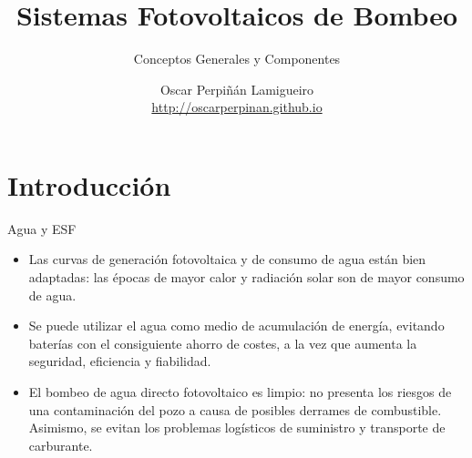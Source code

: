 \documentclass[xcolor={usenames,svgnames,dvipsnames}]{beamer}
\author{Oscar Perpiñán Lamigueiro \\ \url{http://oscarperpinan.github.io}}
\date{}
\title{Sistemas Fotovoltaicos de Bombeo}
\subtitle{Conceptos Generales y Componentes}
\begin{document}
\maketitle

\section{Introducción}
\label{sec:orgcf3e586}

\begin{frame}[label={sec:orgec892bf}]{Agua y ESF}
\begin{itemize}
\item Las \alert{curvas de generación fotovoltaica y de consumo de agua están bien adaptadas}: las épocas de mayor calor y radiación solar son de mayor consumo de agua.

\item Se puede utilizar el \alert{agua como medio de acumulación de energía}, evitando baterías con el consiguiente ahorro de costes, a la vez que aumenta la seguridad, eficiencia y fiabilidad.

\item El bombeo de agua directo fotovoltaico es limpio: \alert{no presenta los riesgos de una contaminación del pozo a causa de posibles derrames de combustible}. Asimismo, se evitan los problemas logísticos de suministro y transporte de carburante.
\end{itemize}
\end{frame}
\end{document}
